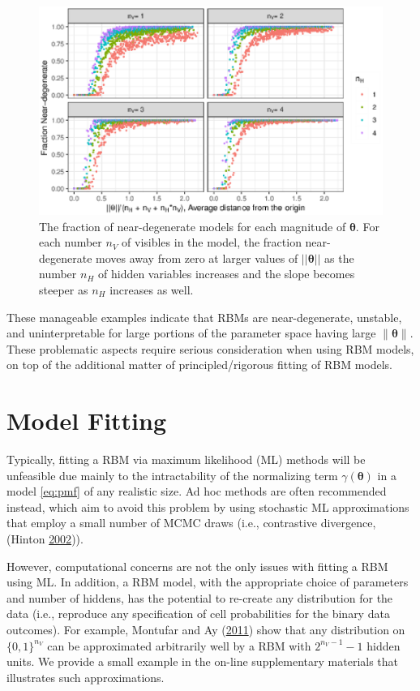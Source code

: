 \documentclass[]{article}
\theoremstyle{definition}
\newcommand{\nv}{{n_{\scriptscriptstyle V}}}
\newcommand{\nh}{{n_{\scriptscriptstyle H}}}
\begin{document}
\par
\begin{figure}
\includegraphics{paper_files/figure-latex/split-plots-dist-1} \caption{The fraction of near-degenerate models for each magnitude of $\boldsymbol \theta$. For each number $\nv$ of visibles in the model, the fraction near-degenerate moves away from zero at larger values of $||\boldsymbol \theta||$ as the number $\nh$ of hidden variables increases and the slope becomes steeper as $\nh$ increases as well.}\label{fig:split-plots-dist}
\end{figure}
These manageable examples indicate that RBMs are near-degenerate,
unstable, and uninterpretable for large portions of the parameter space
having large \(\|\boldsymbol \theta\|\). These problematic aspects
require serious consideration when using RBM models, on top of the
additional matter of principled/rigorous fitting of RBM models.

\hypertarget{model-fitting}{%
\section{Model Fitting}\label{model-fitting}}

Typically, fitting a RBM via maximum likelihood (ML) methods will be
unfeasible due mainly to the intractability of the normalizing term
\(\gamma(\boldsymbol \theta)\) in a model \eqref{eq:pmf} of any realistic
size. Ad hoc methods are often recommended instead, which aim to avoid
this problem by using stochastic ML approximations that employ a small
number of MCMC draws (i.e., contrastive divergence, (Hinton
\protect\hyperlink{ref-hinton2002training}{2002})).

However, computational concerns are not the only issues with fitting a
RBM using ML. In addition, a RBM model, with the appropriate choice of
parameters and number of hiddens, has the potential to re-create any
distribution for the data (i.e., reproduce any specification of cell
probabilities for the binary data outcomes). For example, Montufar and
Ay (\protect\hyperlink{ref-montufar2011refinements}{2011}) show that any
distribution on \(\{0, 1\}^{\nv}\) can be approximated arbitrarily well
by a RBM with \(2^{\nv-1} - 1\) hidden units. We provide a small example
in the on-line supplementary materials that illustrates such
approximations.
\end{document}
